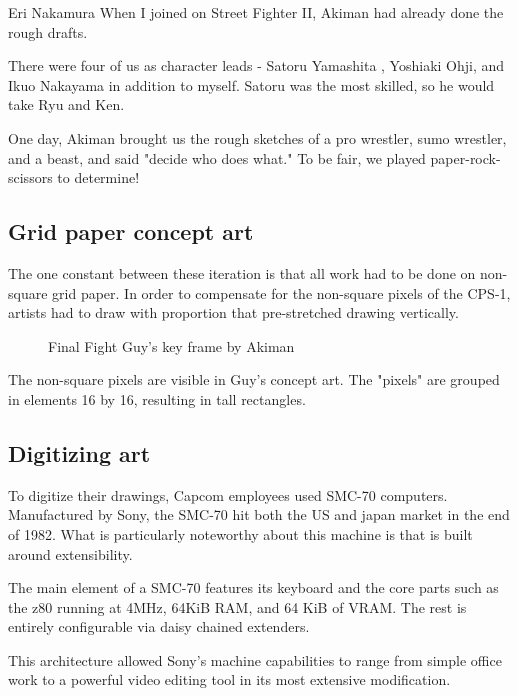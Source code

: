 \begin{q}{Eri Nakamura}
When I joined on Street Fighter II, Akiman had already done the rough drafts. 

There were four of us as character leads - Satoru Yamashita , Yoshiaki Ohji, and Ikuo Nakayama in addition to myself. Satoru was the most skilled, so he would take Ryu and Ken. 

One day, Akiman brought us the rough sketches of a pro wrestler, sumo wrestler, and a beast, and said "decide who does what." To be fair, we played paper-rock-scissors to determine!
\end{q}





\subsection{Grid paper concept art}
The one constant between these iteration is that all work had to be done on non-square grid paper. In order to compensate for the non-square pixels of the CPS-1, artists had to draw with proportion that pre-stretched drawing vertically. 

\begin{figure}[H]
\caption*{Final Fight Guy's key frame by Akiman}
\label{ff_design}
\end{figure}

The non-square pixels are visible in Guy's concept art. The "pixels" are grouped in elements 16 by 16, resulting in tall rectangles.





\subsection{Digitizing art}

To digitize their drawings, Capcom employees used SMC-70 computers. Manufactured by Sony, the SMC-70 hit both the US and japan market in the end of 1982. What is particularly noteworthy about this machine is that is built around extensibility. 

The main element of a SMC-70 features its keyboard and the core parts such as the z80 running at 4MHz, 64KiB RAM, and 64 KiB of VRAM. The rest is entirely configurable via daisy chained extenders. 

This architecture allowed Sony's machine capabilities to range from simple office work to a powerful video editing tool in its most extensive modification. 

